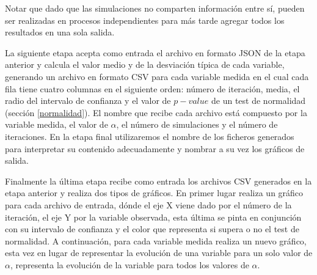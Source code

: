 \documentclass[../proyecto.tex]{memoir}
\begin{document}

Notar que dado que las simulaciones no comparten información entre sí, pueden ser realizadas en procesos independientes para más tarde agregar todos los resultados en una sola salida.

La siguiente etapa acepta como entrada el archivo en formato JSON de la etapa anterior y calcula el valor medio y de la desviación típica de cada variable, generando un archivo en formato CSV \cite{csv} para cada variable medida en el cual cada fila tiene cuatro columnas en el siguiente orden: número de iteración, media, el radio del intervalo de confianza y el valor de $p-value$ de un test de normalidad (sección \ref{normalidad}). El nombre que recibe cada archivo está compuesto por la variable medida, el valor de $\alpha$, el número de simulaciones y el número de iteraciones. En la etapa final utilizaremos el nombre de los ficheros generados para interpretar su contenido adecuadamente y nombrar a su vez los gráficos de salida. 

Finalmente la última etapa recibe como entrada los archivos CSV generados en la etapa anterior y realiza dos tipos de gráficos. En primer lugar realiza un gráfico para cada archivo de entrada, dónde el eje X viene dado por el número de la iteración, el eje Y por la variable observada, esta última se pinta en conjunción con su intervalo de confianza y el color que representa si supera o no el test de normalidad. A continuación, para cada variable medida realiza un nuevo gráfico, esta vez en lugar de representar la evolución de una variable para un solo valor de $\alpha$, representa la evolución de la variable para todos los valores de $\alpha$. 

\end{document}
